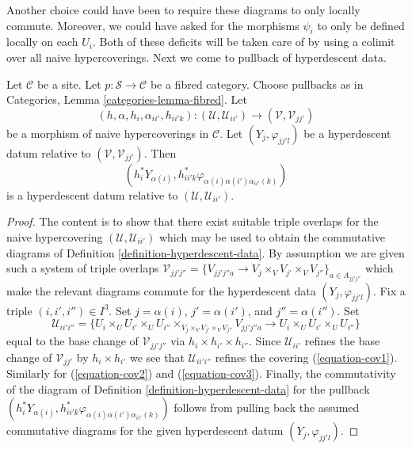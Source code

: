 \noindent
Another choice could have been to require these diagrams to only
locally commute. Moreover, we could have asked for the morphisms
$\psi_i$ to only be defined locally on each $U_i$. Both of these
deficits will be taken care of by using a colimit over all
naive hypercoverings. Next we come to pullback of hyperdescent data.

\begin{lemma}
\label{lemma-pullback-hyperdescent-data}
Let $\mathcal{C}$ be a site.
Let $p : \mathcal{S} \to \mathcal{C}$ be a fibred category.
Choose pullbacks as in Categories, Lemma \ref{categories-lemma-fibred}.
Let
$$
(h, \alpha, h_i, \alpha_{ii'}, h_{ii'k}) :
(\mathcal{U}, \mathcal{U}_{ii'})
\longrightarrow
(\mathcal{V}, \mathcal{V}_{jj'})
$$
be a morphism of naive hypercoverings in $\mathcal{C}$.
Let $(Y_j, \varphi_{jj'l})$ be a hyperdescent datum
relative to $(\mathcal{V}, \mathcal{V}_{jj'})$. Then
$$
(h_i^*Y_{\alpha(i)}, h_{ii'k}^*\varphi_{\alpha(i)\alpha(i')\alpha_{ii'}(k)})
$$
is a hyperdescent datum relative to $(\mathcal{U}, \mathcal{U}_{ii'})$.
\end{lemma}

\begin{proof}
The content is to show that there exist suitable triple overlaps
for the naive hypercovering $(\mathcal{U}, \mathcal{U}_{ii'})$
which may be used to obtain the commutative diagrams of
Definition \ref{definition-hyperdescent-data}. By assumption
we are given such a system of triple overlaps
$\mathcal{V}_{jj'j''} =
\{V_{jj'j''a} \to V_j \times_V V_{j'} \times_V V_{j''}\}_{a \in A_{jj'j''}}$
which make the relevant diagrams commute for the hyperdescent
data $(Y_j, \varphi_{jj'l})$. Fix a triple $(i, i', i'') \in I^3$.
Set $j = \alpha(i)$, $j' = \alpha(i')$, and $j'' = \alpha(i'')$.
Set
$$
\mathcal{U}_{ii'i''} =
\{
U_i \times_U U_{i'} \times_U U_{i''}
\times_{V_j \times_V V_{j'} \times_V V_{j''}}
V_{jj'j''a}
\to
U_i \times_U U_{i'} \times_U U_{i''}\}
$$
equal to the base change of $\mathcal{V}_{jj'j''}$ via
$h_i \times h_{i'} \times h_{i''}$. Since
$\mathcal{U}_{ii'}$ refines the base change of $\mathcal{V}_{jj'}$ by
$h_i \times h_{i'}$ we see that $\mathcal{U}_{ii'i''}$ refines
the covering (\ref{equation-cov1}). Similarly for (\ref{equation-cov2})
and (\ref{equation-cov3}). Finally, the commutativity of the
diagram of Definition \ref{definition-hyperdescent-data} for
the pullback
$(h_i^*Y_{\alpha(i)}, h_{ii'k}^*\varphi_{\alpha(i)\alpha(i')\alpha_{ii'}(k)})$
follows from pulling back the assumed commutative diagrams for the
given hyperdescent datum $(Y_j, \varphi_{jj'l})$.
\end{proof}


